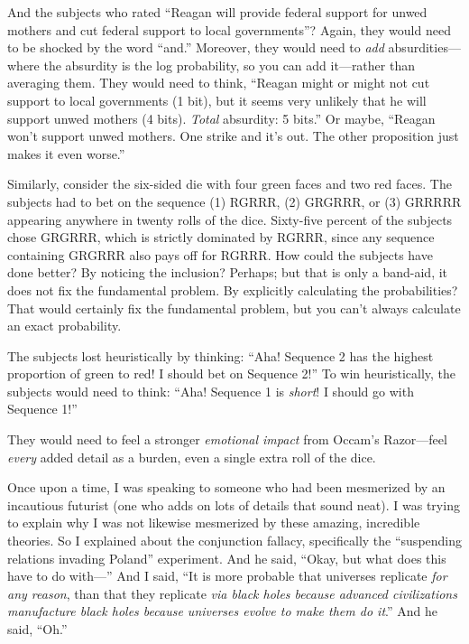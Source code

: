 {
 And the subjects who rated ``Reagan will provide
federal support for unwed mothers and cut federal support to local
governments''? Again, they would need to be shocked
by the word ``and.'' Moreover, they
would need to \textit{add} absurdities---where the absurdity is the log
probability, so you can add it---rather than averaging them. They would
need to think, ``Reagan might or might not cut support
to local governments (1 bit), but it seems very unlikely that he will
support unwed mothers (4 bits). \textit{Total} absurdity: 5
bits.'' Or maybe, ``Reagan
won't support unwed mothers. One strike and
it's out. The other proposition just makes it even
worse.''}

{
 Similarly, consider the six-sided die with four green faces and
two red faces. The subjects had to bet on the sequence (1) RGRRR, (2)
GRGRRR, or (3) GRRRRR appearing anywhere in twenty rolls of the
dice. Sixty-five percent of the subjects chose
GRGRRR, which is strictly dominated by RGRRR, since any sequence
containing GRGRRR also pays off for RGRRR. How could the subjects have
done better? By noticing the inclusion? Perhaps; but that is only a
band-aid, it does not fix the fundamental problem. By explicitly
calculating the probabilities? That would certainly fix the fundamental
problem, but you can't always calculate an exact
probability.}

{
 The subjects lost heuristically by thinking:
``Aha! Sequence 2 has the highest proportion of green
to red! I should bet on Sequence 2!'' To win
heuristically, the subjects would need to think:
``Aha! Sequence 1 is \textit{short}! I should go with
Sequence 1!''}

{
 They would need to feel a stronger \textit{emotional impact} from
Occam's Razor---feel \textit{every} added detail as a
burden, even a single extra roll of the dice.}

{
 Once upon a time, I was speaking to someone who had been
mesmerized by an incautious futurist (one who adds on lots of details
that sound neat). I was trying to explain why I was not likewise
mesmerized by these amazing, incredible theories. So I explained about
the conjunction fallacy, specifically the ``suspending
relations {\textpm} invading Poland'' experiment. And
he said, ``Okay, but what does this have to do
with---'' And I said, ``It is more
probable that universes replicate \textit{for any reason}, than that
they replicate \textit{via black holes because advanced civilizations
manufacture black holes because universes evolve to make them do
it}.'' And he said,
``Oh.''}

